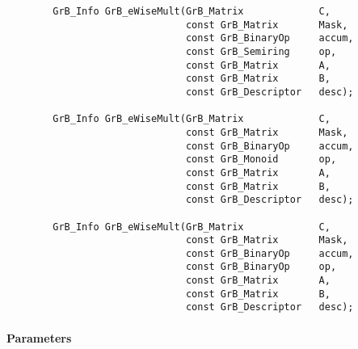 \begin{verbatim}
        GrB_Info GrB_eWiseMult(GrB_Matrix             C,
                               const GrB_Matrix       Mask,
                               const GrB_BinaryOp     accum,
                               const GrB_Semiring     op,
                               const GrB_Matrix       A,
                               const GrB_Matrix       B,
                               const GrB_Descriptor   desc);

        GrB_Info GrB_eWiseMult(GrB_Matrix             C,
                               const GrB_Matrix       Mask,
                               const GrB_BinaryOp     accum,
                               const GrB_Monoid       op, 
                               const GrB_Matrix       A,
                               const GrB_Matrix       B,
                               const GrB_Descriptor   desc);

        GrB_Info GrB_eWiseMult(GrB_Matrix             C,
                               const GrB_Matrix       Mask,
                               const GrB_BinaryOp     accum,
                               const GrB_BinaryOp     op, 
                               const GrB_Matrix       A,
                               const GrB_Matrix       B,
                               const GrB_Descriptor   desc);
\end{verbatim}

\paragraph{Parameters}

